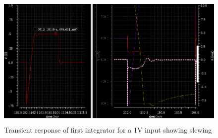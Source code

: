\documentclass[conference]{IEEEtran}
\begin{document}
\begin{figure}[H]
\centering
\includegraphics[height=250px]{piktures/st1_slew}
\caption{Transient response of first integrator for a 1V input showing slewing}
\label{fig:st1_slew}
\end{figure}
\end{document}
